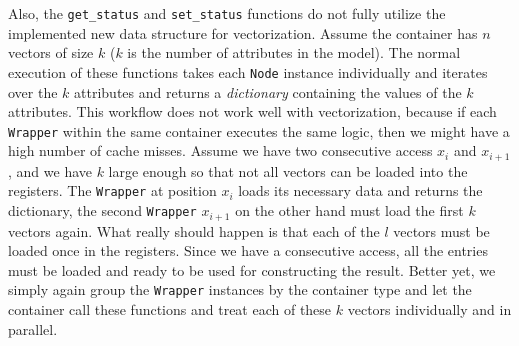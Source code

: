 Also, the \texttt{get\_status} and \texttt{set\_status} functions do not fully utilize the implemented new data structure for vectorization. Assume the container has $n$ vectors of size $k$ ($k$ is the number of attributes in the model). The normal execution of these functions takes each \texttt{Node} instance individually and iterates over the $k$ attributes and returns a \emph{dictionary} containing the values of the $k$ attributes. This workflow does not work well with vectorization, because if  each \texttt{Wrapper} within the same container executes the same logic, then we might have a high number of cache misses. Assume we have two consecutive access $x_i$ and $x_{i+1}$, and we have $k$ large enough so that not all vectors can be loaded into the registers. The \texttt{Wrapper} at position $x_i$ loads its necessary data and returns the dictionary, the second \texttt{Wrapper} $x_{i+1}$ on the other hand must load the first $k$ vectors again. What really should happen is that each of the $l$ vectors must be loaded once in the registers. Since we have a consecutive access, all the entries must be loaded and ready to be used for constructing the result. Better yet, we simply again group the \texttt{Wrapper} instances by  the container type and let the container call these functions and treat each of these $k$ vectors individually and in parallel.

\cleardoublepage
